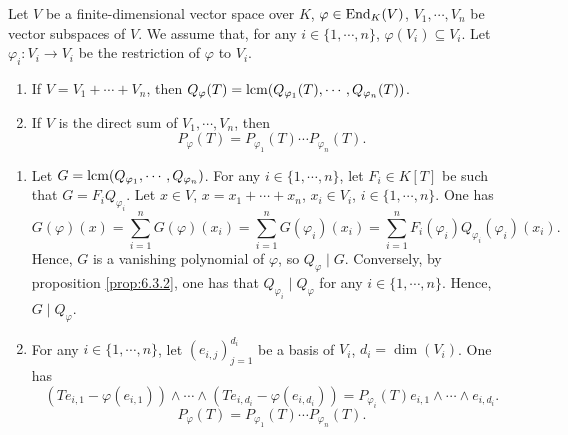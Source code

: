 \begin{propositionenv}\label{prop:6.3.4}
    Let $V$ be a finite-dimensional vector space over $K$,
    $\varphi \in \operatorname{\mathrm{End}}_{K}(V)$,
    $V_1,\cdots,V_n$ be vector subspaces of $V$.
    We assume that, for any $i \in \{1,\cdots,n\}$, $\varphi(V_i) \subseteq V_{i}$.
    Let $\varphi_i:V_i \rightarrow V_i$ be the restriction of $\varphi$ to $V_i$.
    \begin{enumerate}
        \item If $V = V_1 + \cdots + V_n$, then $Q_{\varphi} (T) = \operatorname{\mathrm{lcm}}(Q_{\varphi_1}(T), \cdots, Q_{\varphi_n}(T))$.
        \item If $V$ is the direct sum of $V_1,\cdots,V_n$, then 
            $$P_{\varphi}(T) = P_{\varphi_1}(T) \cdots P_{\varphi_n}(T).$$
    \end{enumerate}
\end{propositionenv}
\begin{proofenv}
    \quad
    \begin{enumerate}
        \item Let $G = \operatorname{\mathrm{lcm}}(Q_{\varphi_1}, \cdots, Q_{\varphi_n})$.
            For any $i \in \{1,\cdots,n\}$,
            let $F_i \in K[T]$ be such that $G = F_{i} Q_{\varphi_i}$.
            Let $x \in V$, $x = x_1 + \cdots + x_n$, $x_i \in V_i$, $i \in \{1,\cdots,n\}$.
            One has
            $$G(\varphi)(x) = \sum_{i=1}^{n} G(\varphi)(x_i) = \sum_{i=1}^{n} G(\varphi_i)(x_i) = \sum_{i=1}^{n} F_i (\varphi_i) Q_{\varphi_i}(\varphi_i)(x_i).$$
            Hence, $G$ is a vanishing polynomial of $\varphi$, so $Q_\varphi \mid G$.
            Conversely, by proposition \ref{prop:6.3.2}, one has that $Q_{\varphi_i} \mid Q_{\varphi}$ for any $i \in \{1,\cdots,n\}$.
            Hence, $G \mid Q_{\varphi}$.
        \item For any $i \in \{1,\cdots,n\}$, let $(e_{i,j})_{j=1}^{d_i}$ be a basis of $V_i$, $d_i = \dim(V_i)$.
            One has
            $$(Te_{i,1} - \varphi(e_{i,1})) \wedge \cdots \wedge (Te_{i,d_i} - \varphi(e_{i,d_i})) = P_{\varphi_i} (T) e_{i,1} \wedge \cdots \wedge e_{i,d_i}.$$
            $$P_{\varphi}(T) = P_{\varphi_{1}}(T) \cdots P_{\varphi_{n}}(T).$$
    \end{enumerate}
\end{proofenv}


